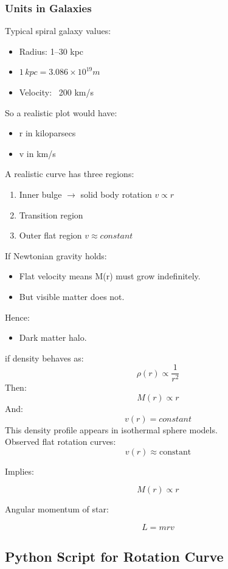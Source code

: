 \documentclass[14pt,a4paper]{article}
\begin{document}
\subsubsection{Units in Galaxies}
Typical spiral galaxy values:
\begin{itemize}
\item Radius: 1–30 kpc
\item \(1\, kpc = 3.086 \times 10^{19} m\)
\item Velocity: ~200 km/s
\end{itemize}
So a realistic plot would have:
\begin{itemize}
\item r in kiloparsecs
\item v in km/s
\end{itemize}
A realistic curve has three regions:
\begin{enumerate}
\item Inner bulge \(\rightarrow\) solid body rotation \( v \propto r \)
\item Transition region
\item Outer flat region  \( v \approx constant\)
\end{enumerate}
If Newtonian gravity holds:
\begin{itemize}
\item Flat velocity means M(r) must grow indefinitely.
\item But visible matter does not.
\end{itemize}
Hence:
\begin{itemize}
\item Dark matter halo.
\end{itemize}
if density behaves as:
\[\rho(r) \propto \frac{1}{r^2}\]
Then:
\[M(r) \propto r\]
And:
\[v(r)=constant\]
This density profile appears in isothermal sphere models.\\
Observed flat rotation curves:
\[
v(r) \approx \text{constant}
\]

Implies:

\[
M(r) \propto r
\]

Angular momentum of star:

\[
L = m r v
\]

\subsection*{Python Script for Rotation Curve}
\end{document}
